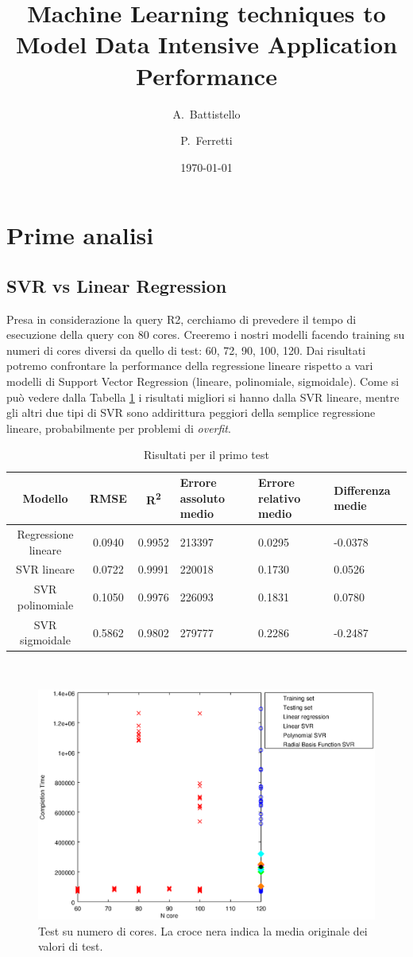 \documentclass[a4paper,11pt]{article}
\author{A.~Battistello\and P.~Ferretti}
\title{Machine Learning techniques to Model Data Intensive Application Performance}
\date{\today}
\begin{document}
\maketitle
\tableofcontents
\section{Prime analisi}
\subsection{SVR vs Linear Regression}
Presa in considerazione la query R2, cerchiamo di prevedere il tempo di esecuzione della query con 80 cores. \newline
Creeremo i nostri modelli facendo training su numeri di cores diversi da quello di test: 60, 72, 90, 100, 120. \newline
Dai risultati potremo confrontare la performance della regressione lineare rispetto a vari modelli di Support Vector Regression (lineare, polinomiale, sigmoidale). \newline
\newline
Come si può vedere dalla Tabella \ref{tabletest1} i risultati migliori si hanno dalla SVR lineare, mentre gli altri due tipi di SVR sono addirittura peggiori della semplice regressione lineare, probabilmente per problemi di \textit{overfit}.
\newline

\begin{table}[bht]
\centering
\label{tabletest1}
\begin{tabular}{c | c c p{2cm} p{2cm} p{2cm}}
Modello & RMSE & R\textsuperscript{2} & Errore assoluto medio & Errore relativo medio & Differenza medie \tabularnewline
\hline
Regressione lineare & 0.0940 & 0.9952 & 213397 & 0.0295 & -0.0378 \\
SVR lineare & 0.0722 & 0.9991 & 220018 & 0.1730 & 0.0526\\
SVR polinomiale & 0.1050 & 0.9976 & 226093 & 0.1831 &0.0780\\
SVR sigmoidale & 0.5862 & 0.9802 & 279777 & 0.2286 & -0.2487
\end{tabular}
\\
\caption{Risultati per il primo test}
\end{table}

\begin {figure}
\centering
\includegraphics[width=\textwidth]{outputPlots/plot_Ncore.eps}
\caption {Test su numero di cores. La croce nera indica la media originale dei valori di test.}
\end {figure}
\end{document}
